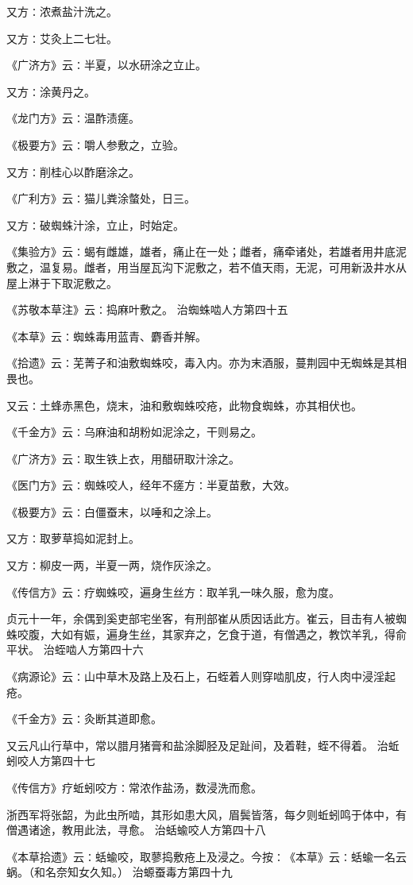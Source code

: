 \documentclass[a4paper,12pt,UTF8,twoside]{ctexbook}
\begin{document}
又方∶浓煮盐汁洗之。

又方∶艾灸上二七壮。

《广济方》云∶半夏，以水研涂之立止。

又方∶涂黄丹之。

《龙门方》云∶温酢渍瘥。

《极要方》云∶嚼人参敷之，立验。

又方∶削桂心以酢磨涂之。

《广利方》云∶猫儿粪涂螫处，日三。

又方∶破蜘蛛汁涂，立止，时始定。

《集验方》云∶蝎有雌雄，雄者，痛止在一处；雌者，痛牵诸处，若雄者用井底泥敷之，温复易。雌者，用当屋瓦沟下泥敷之，若不值天雨，无泥，可用新汲井水从屋上淋于下取泥敷之。

《苏敬本草注》云∶捣麻叶敷之。
治蜘蛛啮人方第四十五

《本草》云∶蜘蛛毒用蓝青、麝香并解。

《拾遗》云∶芜菁子和油敷蜘蛛咬，毒入内。亦为末酒服，蔓荆园中无蜘蛛是其相畏也。

又云∶土蜂赤黑色，烧末，油和敷蜘蛛咬疮，此物食蜘蛛，亦其相伏也。

《千金方》云∶乌麻油和胡粉如泥涂之，干则易之。

《广济方》云∶取生铁上衣，用醋研取汁涂之。

《医门方》云∶蜘蛛咬人，经年不瘥方∶半夏苗敷，大效。

《极要方》云∶白僵蚕末，以唾和之涂上。

又方∶取萝草捣如泥封上。

又方∶柳皮一两，半夏一两，烧作灰涂之。

《传信方》云∶疗蜘蛛咬，遍身生丝方∶取羊乳一味久服，愈为度。

贞元十一年，余偶到奚吏部宅坐客，有刑部崔从质因话此方。崔云，目击有人被蜘蛛咬腹，大如有娠，遍身生丝，其家弃之，乞食于道，有僧遇之，教饮羊乳，得俞平状。
治蛭啮人方第四十六

《病源论》云∶山中草木及路上及石上，石蛭着人则穿啮肌皮，行人肉中浸淫起疮。

《千金方》云∶灸断其道即愈。

又云凡山行草中，常以腊月猪膏和盐涂脚胫及足趾间，及着鞋，蛭不得着。
治蚯蚓咬人方第四十七

《传信方》疗蚯蚓咬方∶常浓作盐汤，数浸洗而愈。

浙西军将张韶，为此虫所啮，其形如患大风，眉鬓皆落，每夕则蚯蚓鸣于体中，有僧遇诸途，教用此法，寻愈。
治蛞蝓咬人方第四十八

《本草拾遗》云∶蛞蝓咬，取蓼捣敷疮上及浸之。今按∶《本草》云∶蛞蝓一名云蜗。（和名奈知女久知。）
治螈蚕毒方第四十九
\end{document}
